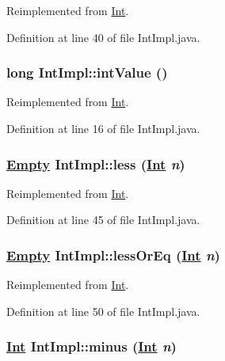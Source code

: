 Reimplemented from \hyperlink{interfaceInt_a6}{Int}.

Definition at line 40 of file Int\-Impl.java.\hypertarget{classIntImpl_a0}{
\subsubsection[intValue]{\setlength{\rightskip}{0pt plus 5cm}long Int\-Impl::int\-Value ()}}
\label{classIntImpl_a0}




Reimplemented from \hyperlink{interfaceInt_a0}{Int}.

Definition at line 16 of file Int\-Impl.java.\hypertarget{classIntImpl_a7}{
\subsubsection[less]{\setlength{\rightskip}{0pt plus 5cm}\hyperlink{interfaceEmpty}{Empty} Int\-Impl::less (\hyperlink{interfaceInt}{Int} {\em n})}}
\label{classIntImpl_a7}




Reimplemented from \hyperlink{interfaceInt_a7}{Int}.

Definition at line 45 of file Int\-Impl.java.\hypertarget{classIntImpl_a8}{
\subsubsection[lessOrEq]{\setlength{\rightskip}{0pt plus 5cm}\hyperlink{interfaceEmpty}{Empty} Int\-Impl::less\-Or\-Eq (\hyperlink{interfaceInt}{Int} {\em n})}}
\label{classIntImpl_a8}




Reimplemented from \hyperlink{interfaceInt_a8}{Int}.

Definition at line 50 of file Int\-Impl.java.\hypertarget{classIntImpl_a2}{
\subsubsection[minus]{\setlength{\rightskip}{0pt plus 5cm}\hyperlink{interfaceInt}{Int} Int\-Impl::minus (\hyperlink{interfaceInt}{Int} {\em n})}}
\label{classIntImpl_a2}




